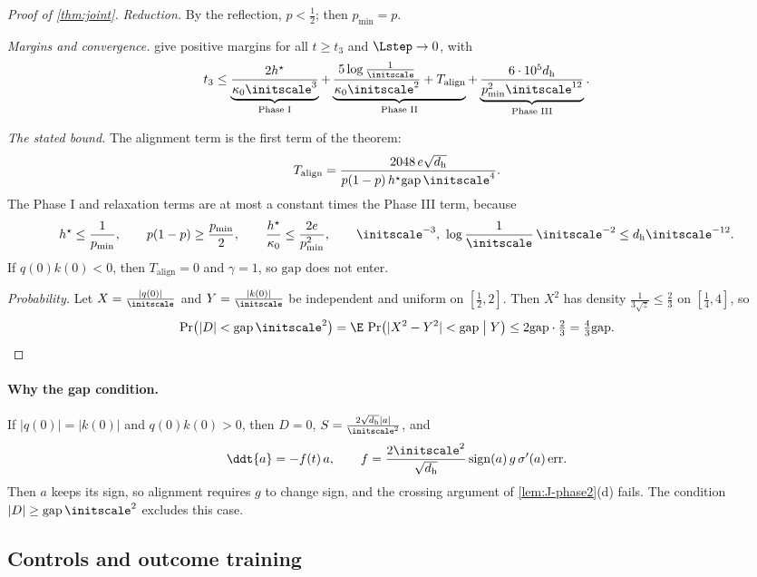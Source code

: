 \begin{proof}[Proof of \cref{thm:joint}]
\emph{Reduction.} By the reflection, $p<\frac{1}{2}$; then $p_{\min}=p$.

\emph{Margins and convergence.}  give positive margins for all $t\ge t_3$ and $\Lstep\to0$, with
\[
 t_3\le\underbrace{\frac{2h^\star}{\kappa_0\initscale^3}}_{\text{Phase I}}+\underbrace{\frac{5\log\frac{1}{\initscale}}{\kappa_0\initscale^2}+T_{\mathrm{align}}}_{\text{Phase II}}
 +\underbrace{\frac{6\cdot10^5d_{\mathrm h}}{p_{\min}^2\initscale^{12}}}_{\text{Phase III}} .
\]

\emph{The stated bound.} The alignment term is the first term of the theorem:
\[
 T_{\mathrm{align}}=\frac{2048\,e\sqrt{d_{\mathrm h}}}{p(1-p)\,h^\star\mathrm{gap}\,\initscale^4}.
\]
The Phase I and relaxation terms are at most a constant times the Phase III term, because
\[
 h^\star\le\frac{1}{p_{\min}},\qquad p(1-p)\ge\frac{p_{\min}}{2},\qquad \frac{h^\star}{\kappa_0}\le\frac{2e}{p_{\min}^2},\qquad
 \initscale^{-3},\ \log\frac{1}{\initscale}\,\initscale^{-2}\le d_{\mathrm h}\initscale^{-12} .
\]
If $q(0)k(0)<0$, then $T_{\mathrm{align}}=0$ and $\gamma=1$, so $\mathrm{gap}$ does not enter.

\emph{Probability.} Let $X=\frac{|q(0)|}{\initscale}$ and $Y=\frac{|k(0)|}{\initscale}$ be independent and uniform on $[\frac{1}{2},2]$. Then $X^2$ has density
$\frac{1}{3\sqrt z}\le\frac{2}{3}$ on $[\frac{1}{4},4]$, so
\[
 \Pr\bigl(|D|<\mathrm{gap}\,\initscale^2\bigr)=\E\,\Pr\bigl(|X^2-Y^2|<\mathrm{gap}\bigm|Y\bigr)\le2\mathrm{gap}\cdot\tfrac{2}{3}=\tfrac{4}{3}\mathrm{gap} .\qedhere
\]
\end{proof}

\paragraph{Why the gap condition.}\label{rem:J-balance} If $|q(0)|=|k(0)|$ and $q(0)k(0)>0$, then $D=0$, $S=\frac{2\sqrt{d_{\mathrm h}}|a|}{\initscale^2}$, and
\[
 \ddt{a}=-f(t)\,a,\qquad f=\frac{2\initscale^2}{\sqrt{d_{\mathrm h}}}\operatorname{sign}(a)\,g\,\sigma'(a)\,\mathrm{err} .
\]
Then $a$ keeps its sign, so alignment requires $g$ to change sign, and the crossing argument of \cref{lem:J-phase2}(d) fails. The condition $|D|\ge\mathrm{gap}\,\initscale^2$ excludes this case.


\subsection{Controls and outcome training}

